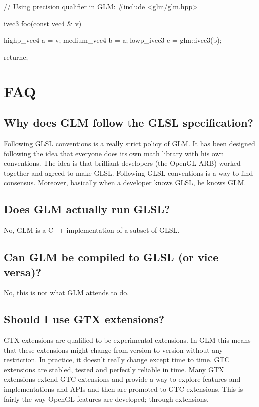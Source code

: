 \documentclass{scrartcl}
\numberwithin{figure}{subsection}
\begin{document}
\begin{cppcode}
// Using precision qualifier in GLM:
#include <glm/glm.hpp>

ivec3 foo(const vec4 & v)
{
  highp_vec4 a = v;
  medium_vec4 b = a;
  lowp_ivec3 c = glm::ivec3(b);

  returnc;
}
\end{cppcode}

\newpage{}

\section{FAQ}

\subsection{Why does GLM follow the GLSL specification?}

Following GLSL conventions is a really strict policy of GLM. It has been designed following the idea that everyone does its own math library with his own conventions. The idea is that brilliant developers (the OpenGL ARB) worked together and agreed to make GLSL. Following GLSL conventions is a way to find consensus. Moreover, basically when a developer knows GLSL, he knows GLM.

\subsection{Does GLM actually run GLSL?}

No, GLM is a C++ implementation of a subset of GLSL.

\subsection{Can GLM be compiled to GLSL (or vice versa)?}

No, this is not what GLM attends to do.

\subsection{Should I use GTX extensions?}

GTX extensions are qualified to be experimental extensions.  In GLM this means that these extensions might change from version to version without any restriction. In practice, it doesn't really change except time to time. GTC extensions are stabled, tested and perfectly reliable in time. Many GTX extensions extend GTC extensions and provide a way to explore features and implementations and APIs and then are promoted to GTC extensions. This is fairly the way OpenGL features are developed; through extensions.
\end{document}
